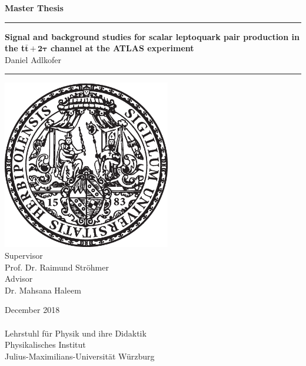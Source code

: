\begin{titlepage}
  \vspace*{-7\baselineskip}
	\enlargethispage{100mm}
		\begin{center}
		\LARGE{\textbf{Master Thesis}\\}
		\vspace{3mm}	
		\textcolor{royalazure}{\noindent\rule{\textwidth}{3pt}}
		\huge{\textbf{Signal and background studies for scalar leptoquark pair production in the t$\bar{\textbf{t}}\,\mathbf{+\,2\tau}$ channel at the ATLAS experiment}\\}
		\vspace{3mm}
		\Large{Daniel Adlkofer\\}
		\textcolor{royalazure}{\noindent\rule{\textwidth}{3pt}}
		\vspace{3mm}
        \includegraphics[width=0.55\textwidth]{figures/neuSIEGEL.eps} \\
		\vspace{3mm}
		Supervisor \\
		\Large{Prof. Dr. Raimund Str\"{o}hmer\\}
               	\vspace{3mm}
                Advisor \\
    \Large{Dr. Mahsana Haleem\\}
               	\vspace{3mm}

		\vspace{5mm}
		December 2018\\
		  \noindent\hrulefill\\
		\vspace{3mm}
 		Lehrstuhl f\"{u}r Physik und ihre Didaktik\\
 		Physikalisches Institut\\
	    Julius-Maximilians-Universit\"{a}t W\"{u}rzburg
	\end{center}
\end{titlepage}
\cleardoubleoddemptypage
